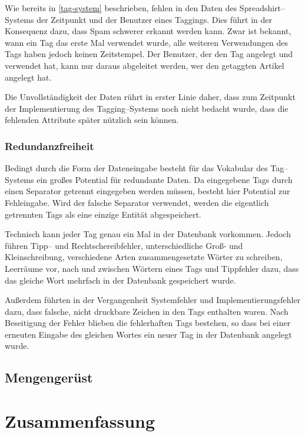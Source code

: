 Wie bereits in \cref{tag-system} beschrieben, fehlen in den Daten des Spreadshirt--Systems der Zeitpunkt und der Benutzer eines Taggings. Dies führt in der Konsequenz dazu, dass Spam schwerer erkannt werden kann. Zwar ist bekannt, wann ein Tag das erste Mal verwendet wurde, alle weiteren Verwendungen des Tags haben jedoch keinen Zeitstempel. Der Benutzer, der den Tag angelegt und verwendet hat, kann nur daraus abgeleitet werden, wer den getaggten Artikel angelegt hat.

Die Unvollständigkeit der Daten rührt in erster Linie daher, dass zum Zeitpunkt der Implementierung des Tagging--Systems noch nicht bedacht wurde, dass die fehlenden Attribute später nützlich sein können.

\subsubsection{Redundanzfreiheit}

Bedingt durch die Form der Dateneingabe besteht für das Vokabular des Tag--Systems ein großes Potential für redundante Daten. Da eingegebene Tags durch einen Separator getrennt eingegeben werden müssen, besteht hier Potential zur Fehleingabe. Wird der falsche Separator verwendet, werden die eigentlich getrennten Tags als eine einzige Entität abgespeichert.

Technisch kann jeder Tag genau ein Mal in der Datenbank vorkommen. Jedoch führen Tipp-- und Rechtschereibfehler, unterschiedliche Groß- und Kleinschreibung, verschiedene Arten zusammengesetzte Wörter zu schreiben, Leerräume vor, nach und zwischen Wörtern eines Tags und Tippfehler dazu, dass das gleiche Wort mehrfach in der Datenbank gespeichert wurde.

Außerdem führten in der Vergangenheit Systemfehler und Implementierungsfehler dazu, dass falsche, nicht druckbare Zeichen in den Tags enthalten waren. Nach Beseitigung der Fehler blieben die fehlerhaften Tags bestehen, so dass bei einer erneuten Eingabe des gleichen Wortes ein neuer Tag in der Datenbank angelegt wurde.

\subsection{Mengengerüst}

\section{Zusammenfassung}